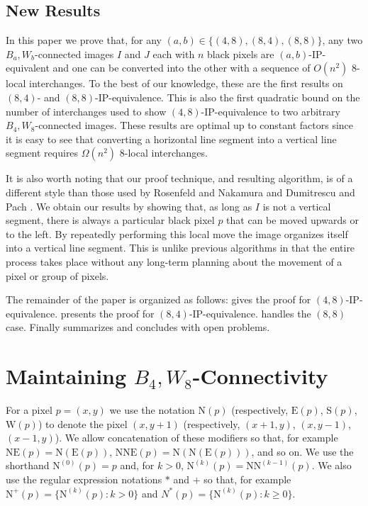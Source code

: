 \documentclass[lotsofwhite,charterfonts]{patmorin}
\newcommand{\foureight}{B_4,W_8}
\newcommand{\N}{\mathrm{N}}
\newcommand{\NE}{\mathrm{NE}}
\newcommand{\E}{\mathrm{E}}
\renewcommand{\S}{\mathrm{S}}
\newcommand{\W}{\mathrm{W}}
\begin{document}
\subsection{New Results}

In this paper we prove that, for any $(a,b)\in\{(4,8),(8,4),(8,8)\}$,
any two $B_a,W_b$-connected images $I$ and $J$ each with $n$ black
pixels are $(a,b)$-IP-equivalent and one can be converted into the
other with a sequence of $O(n^2)$ 8-local interchanges. To the best of
our knowledge, these are the first results on $(8,4)$- and
$(8,8)$-IP-equivalence. This is also the first quadratic bound on the
number of interchanges used to show $(4,8)$-IP-equivalence to two
arbitrary $B_4,W_8$-connected images.  These results are optimal up to
constant factors since it is easy to see that converting a horizontal
line segment into a vertical line segment requires $\Omega(n^2)$
8-local interchanges.

It is also worth noting that our proof technique, and resulting
algorithm, is of a different style than those used by Rosenfeld and
Nakamura \cite{rn02} and Dumitrescu and Pach \cite{dp04}.  We obtain
our results by showing that, as long as $I$ is not a vertical segment,
there is always a particular black pixel $p$ that can be moved upwards
or to the left.  By repeatedly performing this local move the image
organizes itself into a vertical line segment.  This is unlike
previous algorithms \cite{dp04,rn02} in that the entire process takes
place without any long-term planning about the movement of a pixel or
group of pixels.  

The remainder of the paper is organized as follows: 
gives the proof for $(4,8)$-IP-equivalence.  
presents the proof for $(8,4)$-IP-equivalence.  
handles the $(8,8)$ case.  Finally  summarizes and
concludes with open problems.

\section{Maintaining $\foureight$-Connectivity}

For a pixel $p=(x,y)$ we use the notation $\N(p)$ (respectively,
$\E(p)$, $\S(p)$, $\W(p)$) to denote the pixel $(x,y+1)$
(respectively, $(x+1,y)$, $(x,y-1)$, $(x-1,y)$).  We allow
concatenation of these modifiers so that, for example
$\NE(p)=\N(\E(p))$, $\N\NE(p)=\N(\N(\E(p)))$, and so on.  We use the
shorthand $\N^{(0)}(p)=p$ and, for $k>0$,
$\N^{(k)}(p)=\N\N^{(k-1)}(p)$.  We also use the regular expression
notations $*$ and $+$ so that, for example $\N^+(p)=\{\N^{(k)}(p):
k>0\}$ and $N^*(p)=\{\N^{(k)}(p): k\ge 0\}$.
\end{document}
